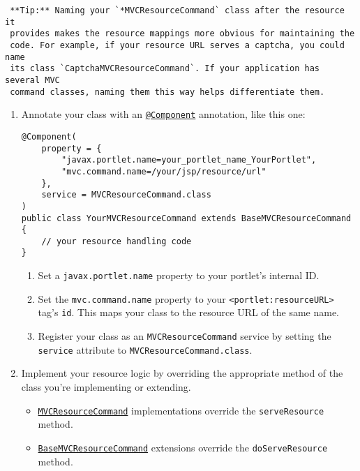 \begin{verbatim}
 **Tip:** Naming your `*MVCResourceCommand` class after the resource it 
 provides makes the resource mappings more obvious for maintaining the
 code. For example, if your resource URL serves a captcha, you could name
 its class `CaptchaMVCResourceCommand`. If your application has several MVC
 command classes, naming them this way helps differentiate them. 
\end{verbatim}

\noindent\hrulefill

\begin{enumerate}
\def\labelenumi{\arabic{enumi}.}
\setcounter{enumi}{5}
\item
  Annotate your class with an
  \href{https://docs.osgi.org/javadoc/osgi.cmpn/7.0.0/org/osgi/service/component/annotations/Component.html}{\texttt{@Component}}
  annotation, like this one:

\begin{verbatim}
@Component(
    property = {
        "javax.portlet.name=your_portlet_name_YourPortlet",
        "mvc.command.name=/your/jsp/resource/url"
    },
    service = MVCResourceCommand.class
)
public class YourMVCResourceCommand extends BaseMVCResourceCommand {
    // your resource handling code
}
\end{verbatim}

  \begin{enumerate}
  \def\labelenumii{\arabic{enumii}.}
  \item
    Set a \texttt{javax.portlet.name} property to your portlet's
    internal ID.
  \item
    Set the \texttt{mvc.command.name} property to your
    \texttt{\textless{}portlet:resourceURL\textgreater{}} tag's
    \texttt{id}. This maps your class to the resource URL of the same
    name.
  \item
    Register your class as an \texttt{MVCResourceCommand} service by
    setting the \texttt{service} attribute to
    \texttt{MVCResourceCommand.class}.
  \end{enumerate}
\item
  Implement your resource logic by overriding the appropriate method of
  the class you're implementing or extending.

  \begin{itemize}
  \item
    \href{https://docs.liferay.com/dxp/portal/7.2-latest/javadocs/portal-kernel/com/liferay/portal/kernel/portlet/bridges/mvc/MVCResourceCommand.html}{\texttt{MVCResourceCommand}}
    implementations override the \texttt{serveResource} method.
  \item
    \href{https://docs.liferay.com/dxp/portal/7.2-latest/javadocs/portal-kernel/com/liferay/portal/kernel/portlet/bridges/mvc/BaseMVCResourceCommand.html}{\texttt{BaseMVCResourceCommand}}
    extensions override the \texttt{doServeResource} method.
  \end{itemize}
\end{enumerate}

